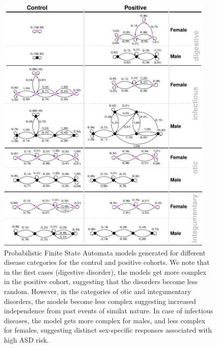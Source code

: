 \documentclass[onecolumn,,10pt]{IEEEtran}
\renewcommand{\captionN}[1]{\caption{\color{CadetBlue4!80!black} \sffamily \fontsize{9}{10}\selectfont #1  }}
\newif\iftikzX
\gdef\treatment{positive\xspace}
\begin{document}
\begin{figure}[!t]
  \tikzexternalenable
  \centering  
  \vspace{-10pt}
  
 \def\DATA{../../data_latest}
\iftikzX

\else
  \includegraphics[width=0.95\textwidth]{Figures/External/pfsa}
  \fi
      \vspace{-5pt}

     \captionN{Probabilistic Finite State Automata models generated for different disease categories for the control and \treatment cohorts. We note that in the first  cases (digestive disorder), the models get more complex in the \treatment cohort, suggesting that the disorders become less random. However, in the categories of otic and integumentary disorders, the models become less complex suggesting increased independence from past events of similat nature. In case of infectious diseases, the model gets more complex for males, and less complex for females, suggesting distinct sex-specific responses associated with high ASD risk.}\label{EXT-autgrid}
\end{figure}
\else
{}\label{EXT-autgrid}
\fi
\end{document}
